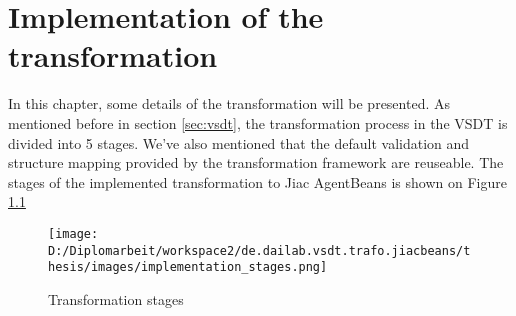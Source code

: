 \chapter{Implementation of the transformation}
\label{chap:implementation}

In this chapter, some details of the transformation will be presented. As mentioned before in section \ref{sec:vsdt}, the transformation process in the VSDT is divided into 5 stages. We've also mentioned that the default validation and structure mapping provided by the transformation framework are reuseable. The stages of the implemented transformation to Jiac AgentBeans is shown on Figure \ref{fig:implementation_stages}

\begin{figure}
	\centering		\texttt{[image: D:/Diplomarbeit/workspace2/de.dailab.vsdt.trafo.jiacbeans/thesis/images/implementation\_stages.png]}
	\caption{Transformation stages}
	\label{fig:implementation_stages}
\end{figure}
